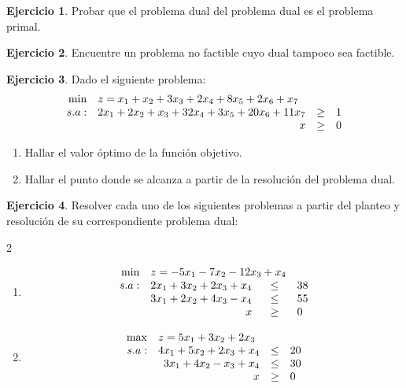 \documentclass[12pt]{article}
\theoremstyle{definition}
\newtheorem{ejer}{Ejercicio}
\newcommand{\bej}{\begin{ejer}}
\newcommand{\fej}{\end{ejer}}
\begin{document}
\bej
    Probar que el problema dual del problema dual es el problema primal.
\fej

\bej
    Encuentre un problema no factible cuyo dual tampoco sea factible.
\fej

\bej
    Dado el siguiente problema:
    \[
    \begin{array}{rrcl}
    \min & \multicolumn{3}{l}{z = x_1+x_2+3x_3+2x_4+8x_5+2x_6+x_7} \\
    s.a: & 2x_1+2x_2+x_3+32x_4+3x_5+20x_6+11x_7 & \geq & 1 \\
     & x & \geq & 0
    \end{array}
    \]
    \begin{enumerate}[label=\alph*)]
        \item Hallar el valor óptimo de la función objetivo.
        \item Hallar el punto donde se alcanza a partir de la resolución del problema dual.
    \end{enumerate}
\fej

\bej 
    Resolver cada uno de los siguientes problemas a partir del planteo y resolución de su correspondiente problema dual:
    \begin{multicols}{2}
    \begin{enumerate}[label=\alph*)]
        \item \[
            \begin{array}{rrcl}
            \min & \multicolumn{2}{l}{z = -5x_1-7x_2-12x_3+x_4} \\
            s.a: & 2x_1+3x_2+2x_3+x_4 & \leq & 38 \\
             & 3x_1+2x_2+4x_3-x_4 & \leq & 55 \\
             & x& \geq & 0
            \end{array}
            \]
    \item \[
            \begin{array}{rrcl}
            \max & \multicolumn{2}{l}{z = 5x_1+3x_2+2x_3} \\
            s.a: & 4x_1+5x_2+2x_3+x_4 & \leq & 20 \\
             & 3x_1+4x_2-x_3+x_4 & \leq & 30 \\
             & x& \geq & 0
            \end{array}
            \]
    \end{enumerate}
    \end{multicols} 
\fej
\end{document}
